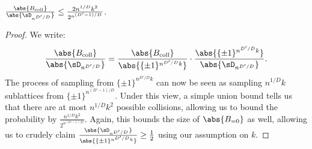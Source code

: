 \begin{fact}
\label{fact:gencolorclasssizes}
    $\frac{\abs{B_{\mathrm{coll}}}}{\abs{\sD_{n^{D'/D}}}} \leq \frac{2n^{1/D}k^2}{2^{n^{(D'-1)/D}}}$.
\end{fact}


\begin{proof}
We write:
\begin{equation*}
    \frac{\abs{B_{\mathrm{coll}}}}{\abs{\sD_{n^{D'/D}}}} = \frac{\abs{B_{\mathrm{coll}}}}{\abs{\{\pm1\}^{n^{D'/D}k}}} \cdot \frac{\abs{\{\pm1\}^{n^{D'/D}k}}}{\abs{\sD_{n^{D'/D}}}}.
\end{equation*}
The process of sampling from $\{\pm1\}^{n^{D'/D}k}$ can now be seen as sampling $n^{1/D}k$ sublattices from $\{\pm1\}^{n^{(D'-1)/D}}$. Under this view, a simple union bound tells us that there are at most $n^{1/D}k^2$ possible collisions, allowing us to bound the probability by $\frac{n^{1/D}k^2}{2^{n^{(D'-1)/D}}}$. Again, this bounds the size of $\abs{B_{=0}}$ as well, allowing us to crudely claim $\frac{\abs{\sD_{n^{D'/D}}}}{\abs{\{\pm1\}^{n^{D'/D}k}}} \geq \frac{1}{2}$ using our assumption on $k$.
\end{proof}


